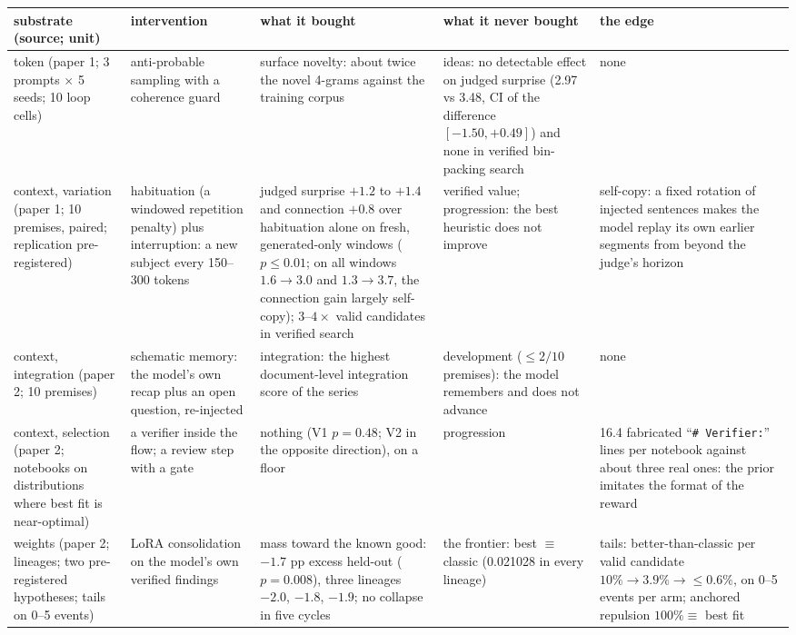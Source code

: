 \documentclass[11pt]{article}
\begin{document}
\begin{table}[p]
\centering\footnotesize
\setlength{\tabcolsep}{3pt}
\begin{tabular}{R{2.0cm} R{2.7cm} R{3.6cm} R{3.3cm} R{3.3cm}}
\toprule
substrate (source; unit) & intervention & what it bought & what it never bought & the edge \\
\midrule
token (paper 1; 3 prompts $\times$ 5 seeds; 10 loop cells) & anti-probable sampling with a coherence guard & surface novelty: about twice the novel 4-grams against the training corpus & ideas: no detectable effect on judged surprise (2.97 vs 3.48, CI of the difference $[-1.50, +0.49]$) and none in verified bin-packing search & none \\
context, variation (paper 1; 10 premises, paired; replication pre-registered) & habituation (a windowed repetition penalty) plus interruption: a new subject every 150--300 tokens & judged surprise $+1.2$ to $+1.4$ and connection $+0.8$ over habituation alone on fresh, generated-only windows ($p\le0.01$; on all windows $1.6\to3.0$ and $1.3\to3.7$, the connection gain largely self-copy); $3$--$4\times$ valid candidates in verified search & verified value; progression: the best heuristic does not improve & self-copy: a fixed rotation of injected sentences makes the model replay its own earlier segments from beyond the judge's horizon \\
context, integration (paper 2; 10 premises) & schematic memory: the model's own recap plus an open question, re-injected & integration: the highest document-level integration score of the series & development ($\le 2/10$ premises): the model remembers and does not advance & none \\
context, selection (paper 2; notebooks on distributions where best fit is near-optimal) & a verifier inside the flow; a review step with a gate & nothing (V1 $p=0.48$; V2 in the opposite direction), on a floor & progression & 16.4 fabricated ``\texttt{\#~Verifier:}'' lines per notebook against about three real ones: the prior imitates the format of the reward \\
weights (paper 2; lineages; two pre-registered hypotheses; tails on 0--5 events) & LoRA consolidation on the model's own verified findings & mass toward the known good: $-1.7$ pp excess held-out ($p=0.008$), three lineages $-2.0$, $-1.8$, $-1.9$; no collapse in five cycles & the frontier: best $\equiv$ classic (0.021028 in every lineage) & tails: better-than-classic per valid candidate $10\%\to3.9\%\to{\le}0.6\%$, on 0--5 events per arm; anchored repulsion $100\%\equiv$ best fit \\

\end{tabular}
\end{table}
\end{document}
